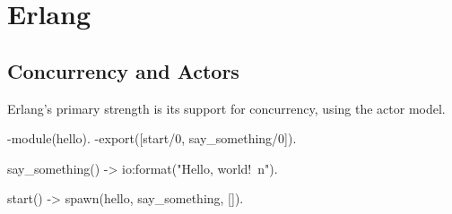 
\chapter{Erlang}

\lipsum[5] %

\section{Concurrency and Actors}
Erlang's primary strength is its support for concurrency, using the actor model.
\begin{erlangcode}
-module(hello).
-export([start/0, say_something/0]).

say_something() ->
    io:format("Hello, world!~n").

start() ->
    spawn(hello, say_something, []).
\end{erlangcode}

\lipsum[6]
